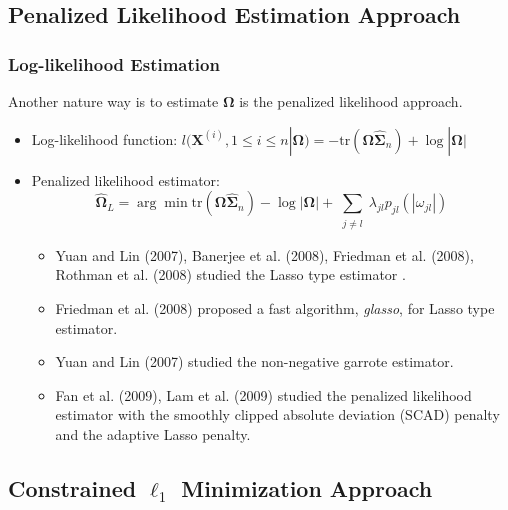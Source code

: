 \documentclass{beamer}
\newcommand{\bX}{\mathbf X}
\newcommand{\bOmega}{{\boldsymbol{\Omega}}}
\newcommand{\bSigma}{{\boldsymbol{\Sigma}}}
\begin{document}
\subsection{Penalized Likelihood Estimation Approach}
\begin{frame}
\frametitle{Log-likelihood Estimation}
Another nature way is to estimate $\bOmega$ is the penalized likelihood approach.
\begin{itemize}[<+->]
\item Log-likelihood function: $l(\bX^(i), 1 \leq i \leq n|\bOmega) = -\text{tr}(\bOmega \hat{\bSigma}_n) + \log|\bOmega|$
\item Penalized likelihood estimator:
\begin{equation}
\label{eq:penalizedlikelihood}
\hat{\bOmega}_L = \arg\min \text{tr}(\bOmega \hat{\bSigma}_n) - \log|\bOmega| + \sum_{\substack{j\neq l}}\lambda_{jl} p_{jl}(|\omega_{jl}|)
\end{equation}   
\begin{itemize}
	\item Yuan and Lin (2007), Banerjee et al. (2008), Friedman et al. (2008), Rothman et al. (2008) studied the Lasso type estimator .
	\item Friedman et al. (2008) proposed a fast algorithm, \emph{glasso}, for Lasso type estimator. 
	\item Yuan and Lin (2007) studied the non-negative garrote estimator.
	\item Fan et al. (2009), Lam et al. (2009) studied the penalized likelihood estimator with the smoothly clipped absolute deviation (SCAD) penalty and the adaptive Lasso penalty.
\end{itemize}
\end{itemize}

\end{frame}



\subsection{Constrained $\ell_1$ Minimization Approach}
\end{document}
